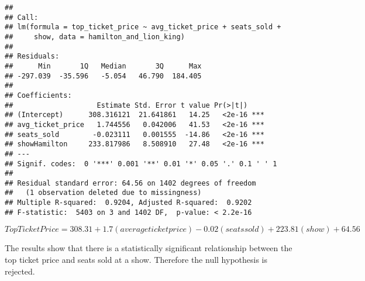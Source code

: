 \documentclass[
]{article}
\begin{document}
\begin{verbatim}
## 
## Call:
## lm(formula = top_ticket_price ~ avg_ticket_price + seats_sold + 
##     show, data = hamilton_and_lion_king)
## 
## Residuals:
##      Min       1Q   Median       3Q      Max 
## -297.039  -35.596   -5.054   46.790  184.405 
## 
## Coefficients:
##                    Estimate Std. Error t value Pr(>|t|)    
## (Intercept)      308.316121  21.641861   14.25   <2e-16 ***
## avg_ticket_price   1.744556   0.042006   41.53   <2e-16 ***
## seats_sold        -0.023111   0.001555  -14.86   <2e-16 ***
## showHamilton     233.817986   8.508910   27.48   <2e-16 ***
## ---
## Signif. codes:  0 '***' 0.001 '**' 0.01 '*' 0.05 '.' 0.1 ' ' 1
## 
## Residual standard error: 64.56 on 1402 degrees of freedom
##   (1 observation deleted due to missingness)
## Multiple R-squared:  0.9204, Adjusted R-squared:  0.9202 
## F-statistic:  5403 on 3 and 1402 DF,  p-value: < 2.2e-16
\end{verbatim}

\[
Top Ticket Price = 308.31 + 1.7 (average ticket price) - 0.02 (seats sold) + 223.81 (show) + 64.56 
\]

The results show that there is a statistically significant relationship between the top ticket price and seats sold at a show. Therefore the null hypothesis is rejected.
\end{document}
